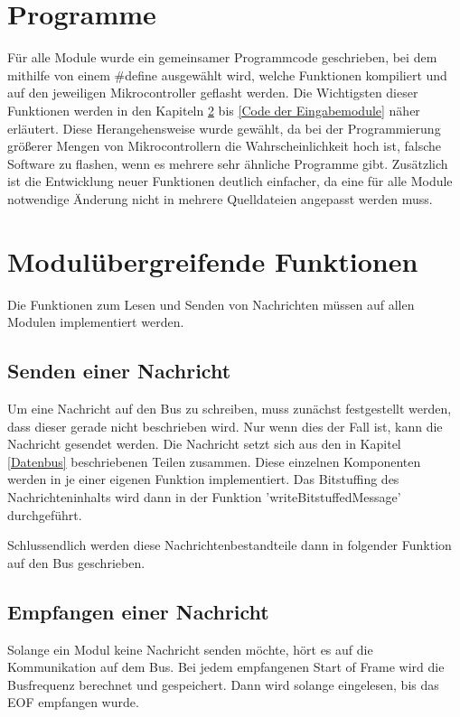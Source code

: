 \section{Programme}
Für alle Module wurde ein gemeinsamer Programmcode geschrieben, bei dem mithilfe von einem \#define ausgewählt wird, welche Funktionen kompiliert und auf den jeweiligen Mikrocontroller geflasht werden. Die Wichtigsten dieser Funktionen werden in den Kapiteln \ref{Modulübergreifende Funktionen} bis \ref{Code der Eingabemodule} näher erläutert. Diese Herangehensweise wurde gewählt, da bei der Programmierung größerer Mengen von Mikrocontrollern die Wahrscheinlichkeit hoch ist, falsche Software zu flashen, wenn es mehrere sehr ähnliche Programme gibt. Zusätzlich ist die Entwicklung neuer Funktionen deutlich einfacher, da eine für alle Module notwendige Änderung nicht in mehrere Quelldateien angepasst werden muss.

\section{Modulübergreifende Funktionen}
\label{Modulübergreifende Funktionen}
Die Funktionen zum Lesen und Senden von Nachrichten müssen auf allen Modulen implementiert werden.

\subsection{Senden einer Nachricht}
Um eine Nachricht auf den Bus zu schreiben, muss zunächst festgestellt werden, dass dieser gerade nicht beschrieben wird. Nur wenn dies der Fall ist, kann die Nachricht gesendet werden. Die Nachricht setzt sich aus den in Kapitel \ref{Datenbus} beschriebenen Teilen zusammen. Diese einzelnen Komponenten werden in je einer eigenen Funktion implementiert. Das Bitstuffing des Nachrichteninhalts wird dann in der Funktion 'writeBitstuffedMessage' durchgeführt.



Schlussendlich werden diese Nachrichtenbestandteile dann in folgender Funktion auf den Bus geschrieben.




\subsection{Empfangen einer Nachricht}
Solange ein Modul keine Nachricht senden möchte, hört es auf die Kommunikation auf dem Bus. Bei jedem empfangenen Start of Frame wird die Busfrequenz berechnet und gespeichert. Dann wird solange eingelesen, bis das EOF empfangen wurde. 

